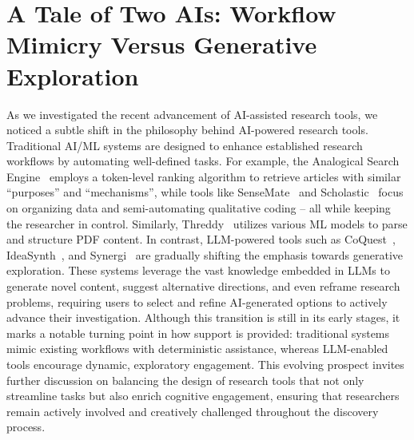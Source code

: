 \section{A Tale of Two AIs: Workflow Mimicry Versus Generative Exploration}
\label{sec:genai-vs-ai}
As we investigated the recent advancement of AI-assisted research tools, we noticed a subtle shift in the philosophy behind AI-powered research tools. Traditional AI/ML systems are designed to enhance established research workflows by automating well-defined tasks. For example, the Analogical Search Engine~\cite{AnalogicalSearchEngine} employs a token-level ranking algorithm to retrieve articles with similar ``purposes'' and ``mechanisms'', while tools like SenseMate~\cite{sensemate} and Scholastic~\cite{scholastic} focus on organizing data and semi-automating qualitative coding -- all while keeping the researcher in control. Similarly, Threddy~\cite{threddy} utilizes various ML models to parse and structure PDF content. In contrast, LLM-powered tools such as CoQuest~\cite{CoQuest}, IdeaSynth~\cite{IdeaSynth}, and Synergi~\cite{synergi} are gradually shifting the emphasis towards generative exploration. These systems leverage the vast knowledge embedded in LLMs to generate novel content, suggest alternative directions, and even reframe research problems, requiring users to select and refine AI-generated options to actively advance their investigation. Although this transition is still in its early stages, it marks a notable turning point in how support is provided: traditional systems mimic existing workflows with deterministic assistance, whereas LLM-enabled tools encourage dynamic, exploratory engagement. This evolving prospect invites further discussion on balancing the design of research tools that not only streamline tasks but also enrich cognitive engagement, ensuring that researchers remain actively involved and creatively challenged throughout the discovery process.